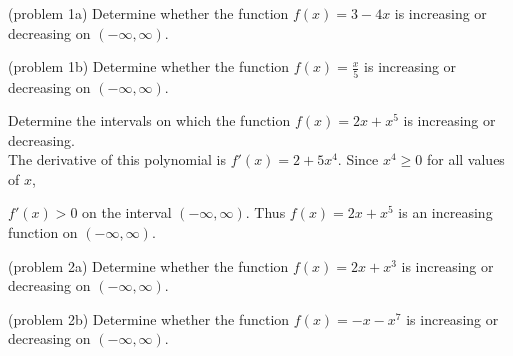 \documentclass[handout]{ximera}
\begin{document}
\begin{problem}(problem 1a)
Determine whether the function $f(x) = 3 - 4x$ is increasing or decreasing on $(-\infty, \infty)$.\\
\begin{multipleChoice}
\end{multipleChoice}
\end{problem}

\begin{problem}(problem 1b)
Determine whether the function $f(x) = \frac{x}{5}$ is increasing or 
decreasing on $(-\infty, \infty)$.\\
\begin{multipleChoice}
\end{multipleChoice}
\end{problem}


\begin{example}[example 2]
Determine the intervals on which the function $f(x) = 2x + x^5$ is increasing or decreasing.\\
The derivative of this polynomial is $f'(x) = 2 + 5x^4$. Since $x^4 \geq 0$ for all values of $x$, 

$f'(x) > 0$ on the interval $(-\infty, \infty)$. Thus $f(x) = 2x + x^5$ is an increasing 
function on $(-\infty, \infty)$.

\end{example}

\begin{problem}(problem 2a)
Determine whether the function $f(x) = 2x + x^3$ is increasing or 
decreasing on $(-\infty, \infty)$.\\
\begin{multipleChoice}
\end{multipleChoice}
\end{problem}

\begin{problem}(problem 2b)
Determine whether the function $f(x) = -x - x^7$ is increasing or 
decreasing on $(-\infty, \infty)$.\\
\begin{multipleChoice}
\end{multipleChoice}
\end{problem}
\end{document}
